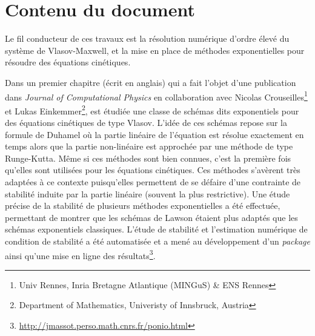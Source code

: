 
\section{Contenu du document}

Le fil conducteur de ces travaux est la résolution numérique d'ordre élevé du système de Vlasov-Maxwell, et la mise en place de méthodes exponentielles pour résoudre des équations cinétiques.

Dans un premier chapitre (écrit en anglais) qui a fait l'objet d'une publication dans \emph{Journal of Computational Physics} en collaboration avec Nicolas Crouseilles\footnote{Univ Rennes, Inria Bretagne Atlantique (MINGuS) \& ENS Rennes} et Lukas Einkemmer\footnote{Department of Mathematics, Univeristy of Innsbruck, Austria}, est étudiée une classe de schémas dits exponentiels pour des équations cinétiques de type Vlasov. L'idée de ces schémas repose sur la formule de Duhamel où la partie linéaire de l'équation est résolue exactement en temps alors que la partie non-linéaire est approchée par une méthode de type Runge-Kutta. Même si ces méthodes sont bien connues, c'est la première fois qu'elles sont utilisées pour les équations cinétiques. Ces méthodes s'avèrent très adaptées à ce contexte puisqu'elles permettent de se défaire d'une contrainte de stabilité induite par la partie linéaire (souvent la plus restrictive). Une étude précise de la stabilité de plusieurs méthodes exponentielles a été effectuée, permettant de montrer que les schémas de Lawson étaient plus adaptés que les schémas exponentiels classiques. L'étude de stabilité et l'estimation numérique de condition de stabilité a été automatisée et a mené au développement d'un \emph{package} \Python{} ainsi qu'une mise en ligne des résultats\footnote{\url{http://jmassot.perso.math.cnrs.fr/ponio.html}}.

